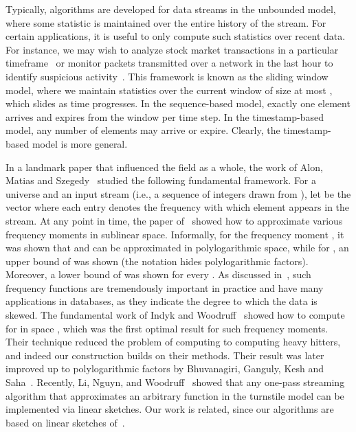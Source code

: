 \documentclass[11pt]{article}
\newcommand{\tbar}[1]{\mbox{\sbox0{#1}\sbox2{\~{}}\ooalign{\hidewidth\raise\dimexpr\ht0-\ht2+.3ex\box2 \hidewidth\cr#1\cr}}}
\begin{document}
Typically, algorithms are developed for data streams in the unbounded model, where some
statistic is maintained over the entire history of the stream.  For certain applications, it is useful
to only compute such statistics over recent data.  For instance, we may wish to analyze
stock market transactions in a particular timeframe~\cite{OMMGM02} or monitor packets
transmitted over a network in the last hour to identify suspicious activity~\cite{VSGB05}.
This framework is known as the sliding window model, where we maintain statistics
over the current window of size at most , which slides as time progresses.  In the sequence-based model,
exactly one element arrives and expires from the window per time step.
In the timestamp-based model, any number of elements may arrive or expire.
Clearly, the timestamp-based model is more general.

In a landmark paper that influenced the field as a whole, the work of Alon, Matias and Szegedy~\cite{AMS96}
studied the following fundamental framework.
For a universe  and an input stream (i.e., a sequence of integers drawn from ),
let  be the vector where each entry  denotes the frequency
with which element  appears in the stream.  At any point in time, the paper of~\cite{AMS96}
showed how to approximate various frequency moments in sublinear space.  Informally, for the  frequency
moment , it was shown that  and  can be approximated in polylogarithmic space,
while for , an upper bound of  was shown (the notation  hides polylogarithmic factors).
Moreover, a lower bound of  was shown for every .  As discussed in~\cite{AMS96},
such frequency functions are tremendously important in practice and have many applications in databases, as
they indicate the degree to which the data is skewed.
The fundamental work of Indyk and Woodruff~\cite{IW05} showed how to compute  for  in
space , which was the first optimal result for such frequency moments.
Their technique reduced the problem of computing  to computing heavy hitters, and indeed
our construction builds on their methods.
Their result was later improved up to polylogarithmic
factors by Bhuvanagiri, Ganguly, Kesh and Saha~\cite{BGKS06}.
Recently, Li, Nguy\tbar{\^e}n, and Woodruff~\cite{LNW14} showed that any one-pass streaming
algorithm that approximates an arbitrary function in the turnstile model can be implemented
via linear sketches.  Our work is related, since our algorithms are based on linear sketches
of~\cite{AMS96}.
\end{document}
